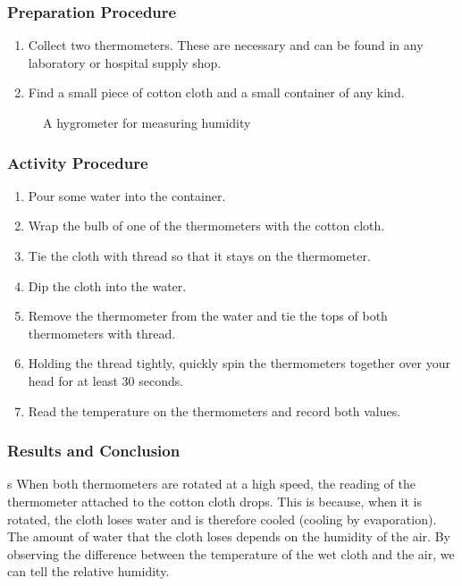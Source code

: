 \subsubsection*{Preparation Procedure}
\begin{enumerate}
\item{Collect two thermometers.  These are necessary and can be found in any laboratory or hospital supply shop.}
\item{Find a small piece of cotton cloth and a small container of any kind.}
\end{enumerate}

\begin{figure}
\begin{center}
\def\svgwidth{100pt}

\caption{A hygrometer for measuring humidity}
\label{fig:hygrometer}
\end{center}
\end{figure}

\subsubsection*{Activity Procedure}
\begin{enumerate}
\item{Pour some water into the container.}
\item{Wrap the bulb of one of the thermometers with the cotton cloth.}
\item{Tie the cloth with thread so that it stays on the thermometer.}
\item{Dip the cloth into the water.}
\item{Remove the thermometer from the water and tie the tops of both thermometers with thread.}
\item{Holding the thread tightly, quickly spin the thermometers together over your head for at least 30 seconds.}
\item{Read the temperature on the thermometers and record both values.}
\end{enumerate}

\subsubsection*{Results and Conclusion}s
When both thermometers are rotated at a high speed, the reading of the thermometer attached to the cotton cloth drops.  This is because, when it is rotated, the cloth loses water and is therefore cooled (cooling by evaporation).  The amount of water that the cloth loses depends on the humidity of the air.  By observing the difference between the temperature of the wet cloth and the air, we can tell the relative humidity.

